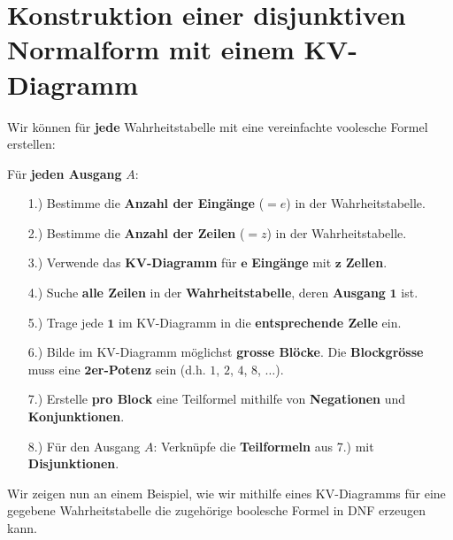 \section{Konstruktion einer disjunktiven Normalform mit einem \acs{KV}-Diagramm}

Wir können für \textbf{jede} Wahrheitstabelle mit eine vereinfachte voolesche Formel erstellen:

\begin{important}
Für \textbf{jeden Ausgang} $A$:
\begin{enumerate}
\item[1.)] Bestimme die \textbf{Anzahl der Eingänge} ($=e$) in der Wahrheitstabelle.
\item[2.)] Bestimme die \textbf{Anzahl der Zeilen} ($=z$) in der Wahrheitstabelle.
\item[3.)] Verwende das \textbf{\acs{KV}-Diagramm} für $\mathbf{e}$ \textbf{Eingänge} mit $\mathbf{z}$ \textbf{Zellen}.
\item[4.)] Suche \textbf{alle Zeilen} in der \textbf{Wahrheitstabelle}, deren \textbf{Ausgang} $\mathbf{1}$ ist.
\item[5.)] Trage jede $\mathbf{1}$ im \acs{KV}-Diagramm in die \textbf{entsprechende Zelle} ein.
\item[6.)] Bilde im \acs{KV}-Diagramm möglichst \textbf{grosse Blöcke}. Die \textbf{Blockgrösse} muss eine $\mathbf{2}$\textbf{er-Potenz} sein (d.h. $1$, $2$, $4$, $8$, $\dots$).
\item[7.)] Erstelle \textbf{pro Block} eine Teilformel mithilfe von \textbf{Negationen} und \textbf{Konjunktionen}.
\item[8.)] Für den Ausgang $A$: Verknüpfe die \textbf{Teilformeln} aus 7.) mit \textbf{Disjunktionen}.
\end{enumerate}
\end{important}

Wir zeigen nun an einem Beispiel, wie wir mithilfe eines \ac{KV}-Diagramms für eine gegebene Wahrheitstabelle die zugehörige boolesche Formel in \ac{DNF} erzeugen kann.

